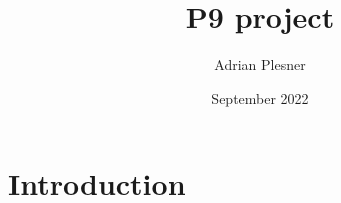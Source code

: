 \documentclass{article}
\title{P9 project}
\author{Adrian Plesner}
\date{September 2022}
\begin{document}
\maketitle

\section{Introduction}
\end{document}
